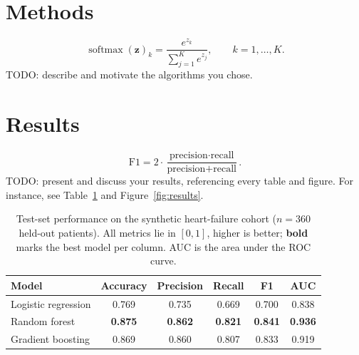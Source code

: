 \documentclass{article}
\begin{document}
\section{Methods}
\begin{equation}
  \operatorname{softmax}(\mathbf{z})_k = \frac{e^{z_k}}{\sum_{j=1}^{K} e^{z_j}},
  \qquad k = 1, \dots, K .
\end{equation}
TODO: describe and motivate the algorithms you chose.

\section{Results}
\begin{equation}
  \text{F1} = 2 \cdot \frac{\text{precision} \cdot \text{recall}}
  {\text{precision} + \text{recall}} .
\end{equation}
TODO: present and discuss your results, referencing every table and figure. For instance, see Table~\ref{tab:results} and Figure~\ref{fig:results}.

\begin{table}[ht]
  \caption{Test-set performance on the synthetic heart-failure cohort
    ($n = 360$ held-out patients). All metrics lie in $[0,1]$, higher is better;
    \textbf{bold} marks the best model per column. AUC is the area under the ROC
  curve.}
  \label{tab:results}
  \centering
  \begin{tabular}{lccccc}
    \toprule
    Model               & Accuracy       & Precision      & Recall         & F1             & AUC            \\
    \midrule
    Logistic regression & 0.769          & 0.735          & 0.669          & 0.700          & 0.838          \\
    Random forest       & \textbf{0.875} & \textbf{0.862} & \textbf{0.821} & \textbf{0.841} & \textbf{0.936} \\
    Gradient boosting   & 0.869          & 0.860          & 0.807          & 0.833          & 0.919          \\
    \bottomrule
  \end{tabular}
\end{table}
\end{document}
